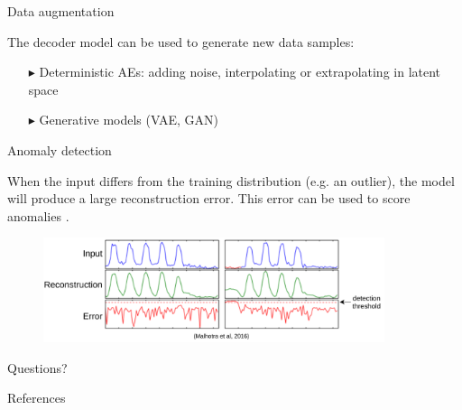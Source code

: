 \documentclass[handout]{beamer}
\begin{document}
  \begin{frame}{Data augmentation}

    The decoder model can be used to \alert{generate new data samples}:
    \pause
    \begin{itemize}
      \item[$\blacktriangleright$] Deterministic AEs: adding noise, interpolating or extrapolating in latent space \cite{Devries2017}
      \pause
      \item[$\blacktriangleright$] Generative models (VAE, GAN)
    \end{itemize}

  \end{frame}

  \begin{frame}{Anomaly detection}
    
    When the input differs from the training distribution (e.g. an outlier), the model will produce a large reconstruction error. This error can be used to \alert{score anomalies} \cite{Malhotra2016}.

    \begin{figure}
      \includegraphics[width=10cm]{rc/anomaly-detection}
    \end{figure}

  \end{frame}

  \begin{frame}[standout]
    Questions?
  \end{frame}

  \appendix

  \begin{frame}[allowframebreaks]{References}
    
    
    
  
  \end{frame}
\end{document}
